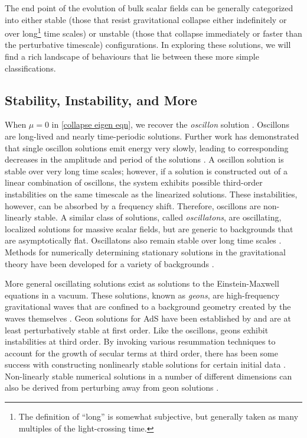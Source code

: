 \documentclass[../PhD.tex]{subfiles}
\begin{document}
The end point of the evolution of bulk scalar fields can be generally categorized into either stable (those that resist gravitational collapse either indefinitely or over long\footnote{The definition of ``long'' is somewhat subjective, but generally taken as many multiples of the light-crossing time.} time scales) or unstable (those that collapse immediately or faster than the perturbative timescale) configurations. In exploring these solutions, we will find a rich landscape of behaviours that lie between these more simple classifications.


\subsection{Stability, Instability, and More}

When $\mu = 0$ in \eqref{collapse eigen eqn}, we recover the \emph{oscillon} solution \cite{1701.09100}. Oscillons are long-lived and nearly time-periodic solutions. Further work has demonstrated that single oscillon solutions emit energy very slowly, leading to corresponding decreases in the amplitude and period of the solutions \cite{hep-ph/9503217}. A oscillon solution is stable over very long time scales; however, if a solution is constructed out of a linear combination of oscillons, the system exhibits possible third-order instabilities on the same timescale as the linearized solutions. These instabilities, however, can be absorbed by a frequency shift. Therefore, oscillons are non-linearly stable. A similar class of solutions, called \emph{oscillatons}, are oscillating, localized solutions for massive scalar fields, but are generic to backgrounds that are asymptotically flat. Oscillatons also remain stable over long time scales \cite{gr-qc/0310006}. Methods for numerically determining stationary solutions in the gravitational theory have been developed for a variety of backgrounds \cite{1510.02804}.

More general oscillating solutions exist as solutions to the Einstein-Maxwell equations in a vacuum. These solutions, known as \emph{geons}, are high-frequency gravitational waves that are confined to a background geometry created by the waves themselves \cite{Wheeler:1955zz}. Geon solutions for AdS have been established by \cite{1109.1825} and are at least perturbatively stable at first order. Like the oscillons, geons exhibit instabilities at third order. By invoking various resummation techniques to account for the growth of secular terms at third order, there has been some success with constructing nonlinearly stable solutions for certain initial data \cite{1408.5906, 1701.07804}. Non-linearly stable numerical solutions in a number of different dimensions can also be derived from perturbing away from geon solutions \cite{1503.07746}. 
\end{document}
